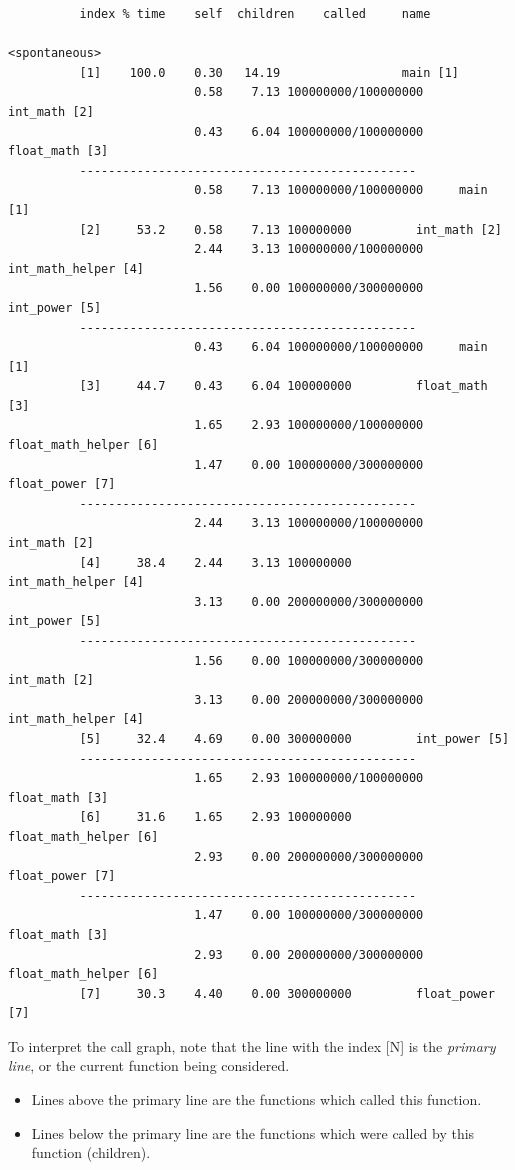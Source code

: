 \documentclass[a4paper]{report}
\begin{document}
  \begin{lstlisting}
          index % time    self  children    called     name
                                                           <spontaneous>
          [1]    100.0    0.30   14.19                 main [1]
                          0.58    7.13 100000000/100000000     int_math [2]
                          0.43    6.04 100000000/100000000     float_math [3]
          -----------------------------------------------
                          0.58    7.13 100000000/100000000     main [1]
          [2]     53.2    0.58    7.13 100000000         int_math [2]
                          2.44    3.13 100000000/100000000     int_math_helper [4]
                          1.56    0.00 100000000/300000000     int_power [5]
          -----------------------------------------------
                          0.43    6.04 100000000/100000000     main [1]
          [3]     44.7    0.43    6.04 100000000         float_math [3]
                          1.65    2.93 100000000/100000000     float_math_helper [6]
                          1.47    0.00 100000000/300000000     float_power [7]
          -----------------------------------------------
                          2.44    3.13 100000000/100000000     int_math [2]
          [4]     38.4    2.44    3.13 100000000         int_math_helper [4]
                          3.13    0.00 200000000/300000000     int_power [5]
          -----------------------------------------------
                          1.56    0.00 100000000/300000000     int_math [2]
                          3.13    0.00 200000000/300000000     int_math_helper [4]
          [5]     32.4    4.69    0.00 300000000         int_power [5]
          -----------------------------------------------
                          1.65    2.93 100000000/100000000     float_math [3]
          [6]     31.6    1.65    2.93 100000000         float_math_helper [6]
                          2.93    0.00 200000000/300000000     float_power [7]
          -----------------------------------------------
                          1.47    0.00 100000000/300000000     float_math [3]
                          2.93    0.00 200000000/300000000     float_math_helper [6]
          [7]     30.3    4.40    0.00 300000000         float_power [7]
  \end{lstlisting}

To interpret the call graph, note that the line with the index [N] is the \emph{primary line},
or the current function being considered.
\begin{itemize}
    \item Lines above the primary line are the functions which called this function.
    \item Lines below the primary line are the functions which were called by this function
      (children).
\end{itemize}
\end{document}
